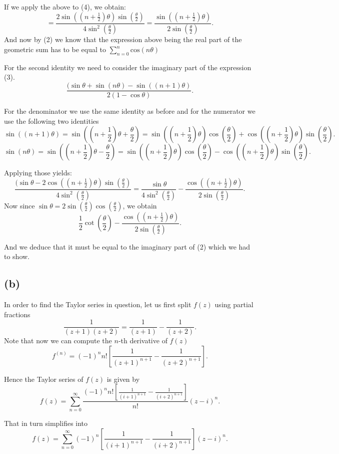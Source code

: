 \documentclass[12pt]{article}
\begin{document}
If we apply the above to (4), we obtain:
\[
	= \frac{2\sin(\left(n+\frac{1}{2}\right)\theta) \sin(\frac{\theta}{2})}{4\sin^2\left(\frac{\theta}{2}\right)} =
	\frac{\sin(\left(n+\frac{1}{2}\right)\theta)}{2\sin\left(\frac{\theta}{2}\right)}
.\]
And now by (2) we know that the expression above being the real part of the geometric sum has to be equal to
$\sum^{n}_{n = 0} \text{cos}(n\theta)$

For the second identity we need to consider the imaginary part of the expression (3).
\[
	\frac{(\sin\theta + \sin(n\theta) - \sin((n+1)\theta)}{2(1 - \cos\theta)}
.\]

For the denominator we use the same identity as before and for the numerator we use the following two identities
\[
	\sin((n+1)\theta) = \sin(\left(n+\frac{1}{2}\right)\theta + \frac{\theta}{2}) =
	\sin(\left(n+\frac{1}{2}\right)\theta) \cos(\frac{\theta}{2}) + \cos(\left(n+\frac{1}{2}\right)\theta) \sin(\frac{\theta}{2})
.\]
\[
	\sin(n\theta) = \sin(\left(n+\frac{1}{2}\right)\theta - \frac{\theta}{2}) =
	\sin(\left(n+\frac{1}{2}\right)\theta) \cos(\frac{\theta}{2}) - \cos(\left(n+\frac{1}{2}\right)\theta) \sin(\frac{\theta}{2})
.\]

Applying those yields:
\[
	\frac{(\sin\theta  - 2\cos((n+\frac{1}{2})\theta)\sin(\frac{\theta}{2})}{4\sin^2(\frac{\theta}{2})} =
	\frac{\sin\theta}{4\sin^2(\frac{\theta}{2})} -\frac{\cos((n+\frac{1}{2})\theta)}{2\sin(\frac{\theta}{2})}
.\]
Now since $\sin\theta = 2\sin(\frac{\theta}{2})\cos(\frac{\theta}{2})$, we obtain
\[
	\frac{1}{2}\cot(\frac{\theta}{2}) -\frac{\cos((n+\frac{1}{2})\theta)}{2\sin(\frac{\theta}{2})}
.\]

And we deduce that it must be equal to the imaginary part of (2) which we had to show.
\subsection*{(b)}
In order to find the Taylor series in question, let us first split $f(z)$ using partial fractions
\[
	\frac{1}{(z+1)(z+2)} = \frac{1}{(z+1)} - \frac{1}{(z+2)}
.\]
Note that now we can compute the $n$-th derivative of $f(z)$
 \[
	 f^{(n)} = (-1)^{n} n! \left[ \frac{1}{(z+1)^{n+1}} - \frac{1}{(z+2)^{n+1}} \right]
.\]

Hence the Taylor series of $f(z)$ is given by
\[
	f(z) = \sum^{\infty}_{n=0} \frac{(-1)^{n} n! \left[ \frac{1}{(i+1)^{n+1}} - \frac{1}{(i+2)^{n+1}} \right]}{n!} (z - i)^{n}
.\]

That in turn simplifies into
\[
	f(z) = \sum^{\infty}_{n=0} (-1)^{n}\left[ \frac{1}{(i+1)^{n+1}} - \frac{1}{(i+2)^{n+1}} \right](z - i)^{n}
.\]
\end{document}
